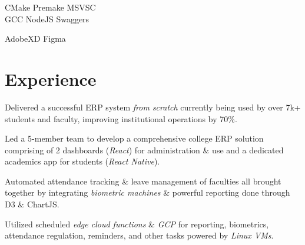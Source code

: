 \documentclass[]{deedy-resume-openfont}
\begin{document}
\begin{minipage}[t]{0.31\textwidth}
\vspace{6pt}

CMake \textbullet{}
Premake \textbullet{}
MSVSC \\
GCC \textbullet{}
NodeJS \textbullet{}
Swaggers \\

\vspace{6   pt}


AdobeXD \textbullet{}
Figma \\

\sectionsep

%
%

\end{minipage} 
\hfill
\begin{minipage}[t]{0.66\textwidth} 



\section{Experience}

\vspace{\topsep} %

\begin{tightemize}
\item Delivered a successful ERP system \textit{from scratch} currently being used by over 7k+ students and faculty, improving institutional operations by 70\%.
\item Led a 5-member team to develop a comprehensive college ERP solution comprising of 2 dashboards (\textit{React}) for administration \& use and a dedicated academics app for students (\textit{React Native}).
\item Automated attendance tracking \& leave management of faculties all brought together by integrating \textit{biometric machines} \& powerful reporting done through D3 \& ChartJS.
\item Utilized scheduled \textit{edge cloud functions} \& \textit{GCP} for reporting, biometrics, attendance regulation, reminders, and other tasks powered by \textit{Linux VMs}.
\end{tightemize}
\sectionsep


\end{minipage}
\end{document}
